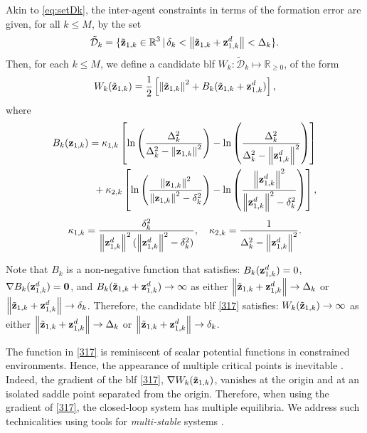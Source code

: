 Akin to \eqref{eq:setDk}, the inter-agent constraints in terms of the formation error are given, for all $k\leq M$, by the set
\begin{equation}\label{n367}
\tilde{\mathcal{D}}_k=\{\tilde{\mathbf{z}}_{1, k}\in\mathbb{R}^{3}\,|\,\delta_k<\left\|\tilde{\mathbf{z}}_{1, k}+\mathbf{z}_{1, k}^d\right\|<\Delta_k\}.
\end{equation}
Then, for each $k\leq M$, we define a candidate \gls{blf} $W_k:\mathcal{\tilde D}_k\mapsto\mathbb{R}_{\geq 0}$, of the form
\begin{equation}\label{317}
W_k(\tilde{\mathbf{z}}_{1, k}) = \frac{1}{2}\left[\left\|\tilde{\mathbf{z}}_{1, k}\right\|^2+B_k(\tilde{\mathbf{z}}_{1, k}+\mathbf{z}_{1, k}^d)\right],
\end{equation}
where 
\begin{equation*}\label{520}\begin{aligned}
B_k(\mat{z}_{1, k}) =&\; 
\kappa_{1, k}\left[\ln\left(\frac{\Delta_k^2}{\Delta_k^2-\norm{\mat{z}_{1, k}}^2}\right)-\ln\left(\frac{\Delta_k^2}{\Delta_k^2-\norm{\mat{z}_{1, k}^d}^2}\right)\right]
\\&\hspace{-2mm}+\kappa_{2, k}\left[\ln\left(\frac{\norm{\mat{z}_{1, k}}^2}{\norm{\mat{z}_{1, k}}^2-\delta_k^2}\right)-\ln\left(\frac{\norm{\mat{z}_{1, k}^d}^2}{\norm{\mat{z}_{1, k}^d}^2-\delta_k^2}\right)\right], 
\end{aligned}\end{equation*}
\begin{equation*}\label{379}
\kappa_{1, k} = \frac{\delta_k^2}{\left\|\mathbf{z}_{1, k}^d\right\|^2(\left\|\mathbf{z}_{1, k}^d\right\|^2-\delta_k^2)},\quad \kappa_{2, k}=\frac{1}{\Delta_k^2-\left\|\mathbf{z}_{1, k}^d\right\|^2}.
\end{equation*}

Note that $B_k$ is a non-negative function that satisfies: ${B}_k(\mathbf{z}_{1, k}^d) = 0$, $\nabla{B}_k(\mathbf{z}_{1, k}^d) = \mathbf{0}$, and ${B}_k(\tilde{\mathbf{z}}_{1, k}+\mathbf{z}_{1, k}^d)\rightarrow\infty$ as either $\left\|\tilde{\mathbf{z}}_{1, k}+\mathbf{z}_{1, k}^d\right\|\rightarrow\Delta_k$ or $\left\|\tilde{\mathbf{z}}_{1, k}+\mathbf{z}_{1, k}^d\right\|\rightarrow\delta_k$.
Therefore, the candidate \gls{blf} \eqref{317} satisfies: $W_k(\tilde{\mathbf{z}}_{1, k})\rightarrow\infty$ as either $\left\|\tilde{\mathbf{z}}_{1, k}+\mathbf{z}_{1, k}^d\right\|\rightarrow\Delta_k$ or $\left\|\tilde{\mathbf{z}}_{1, k}+\mathbf{z}_{1, k}^d\right\|\rightarrow\delta_k$.

\begin{rmk}\label{rmk:V:equilibria}
	The function in \eqref{317} is reminiscent of scalar potential functions in constrained environments. Hence, the appearance of multiple critical points is inevitable \cite{rimon_exact_1992}.
	Indeed, the gradient of the \gls{blf} \eqref{317}, $\nabla W_k(\tilde{\mathbf{z}}_{1, k})$, vanishes at the origin and at an isolated saddle point separated from the origin. 
	Therefore, when using the gradient of \eqref{317}, the closed-loop system has multiple equilibria.
	We address such technicalities using tools for \textit{multi-stable} systems \cite{forni_cascade_2016,monzon2006local}.
\end{rmk}

